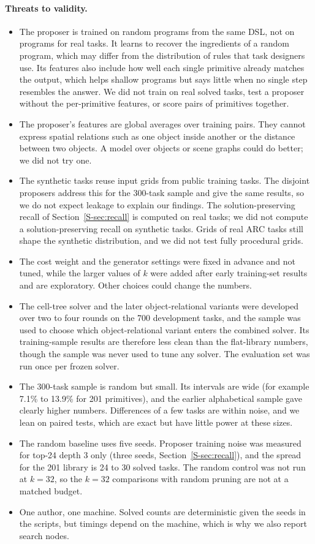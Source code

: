 \documentclass[sigconf,nonacm]{acmart}
\begin{document}
\paragraph{Threats to validity.}
\begin{itemize}
  \item The proposer is trained on random programs from the same DSL, not on programs for real tasks. It learns to recover the ingredients of a random program, which may differ from the distribution of rules that task designers use. Its features also include how well each single primitive already matches the output, which helps shallow programs but says little when no single step resembles the answer. We did not train on real solved tasks, test a proposer without the per-primitive features, or score pairs of primitives together.
  \item The proposer's features are global averages over training pairs. They cannot express spatial relations such as one object inside another or the distance between two objects. A model over objects or scene graphs could do better; we did not try one.
  \item The synthetic tasks reuse input grids from public training tasks. The disjoint proposers address this for the 300-task sample and give the same results, so we do not expect leakage to explain our findings. The solution-preserving recall of Section~\ref{S-sec:recall} is computed on real tasks; we did not compute a solution-preserving recall on synthetic tasks. Grids of real ARC tasks still shape the synthetic distribution, and we did not test fully procedural grids.
  \item The cost weight and the generator settings were fixed in advance and not tuned, while the larger values of $k$ were added after early training-set results and are exploratory. Other choices could change the numbers.
  \item The cell-tree solver and the later object-relational variants were developed over two to four rounds on the 700 development tasks, and the sample was used to choose which object-relational variant enters the combined solver. Its training-sample results are therefore less clean than the flat-library numbers, though the sample was never used to tune any solver. The evaluation set was run once per frozen solver.
  \item The 300-task sample is random but small. Its intervals are wide (for example 7.1\% to 13.9\% for 201 primitives), and the earlier alphabetical sample gave clearly higher numbers. Differences of a few tasks are within noise, and we lean on paired tests, which are exact but have little power at these sizes.
  \item The random baseline uses five seeds. Proposer training noise was measured for top-24 depth 3 only (three seeds, Section~\ref{S-sec:recall}), and the spread for the 201 library is 24 to 30 solved tasks. The random control was not run at $k=32$, so the $k=32$ comparisons with random pruning are not at a matched budget.
  \item One author, one machine. Solved counts are deterministic given the seeds in the scripts, but timings depend on the machine, which is why we also report search nodes.
\end{itemize}
\end{document}
